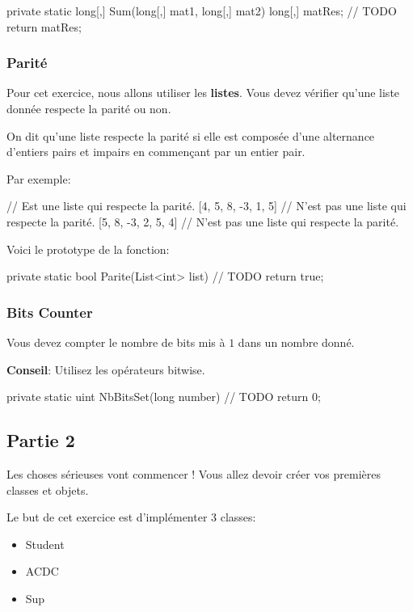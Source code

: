 \begin{code}
private static long[,] Sum(long[,] mat1, long[,] mat2)
{
	long[,] matRes;
	// TODO
    return matRes;
}
\end{code}

\subsubsection{Parité}

Pour cet exercice, nous allons utiliser les \textbf{listes}. Vous devez vérifier qu'une liste donnée respecte la parité ou non.

On dit qu'une liste respecte la parité si elle est composée d'une alternance d'entiers pairs et impairs en commençant par un entier pair.

Par exemple:

\begin{code}
[4, 5, 8, -3, 2, 5] // Est une liste qui respecte la parité.
[4, 5, 8, -3, 1, 5] // N'est pas une liste qui respecte la parité.
[5, 8, -3, 2, 5, 4] // N'est pas une liste qui respecte la parité.
\end{code}

Voici le prototype de la fonction:
\begin{code}
private static bool Parite(List<int> list)
{
	// TODO
    return true;
}
\end{code}

\subsubsection{Bits Counter}

Vous devez compter le nombre de bits mis à \(1\) dans un nombre donné.

\textbf{Conseil}: Utilisez les opérateurs bitwise.

\begin{code}
private static uint NbBitsSet(long number)
{
	// TODO
    return 0;
}
\end{code}

\newpage
\subsection{Partie 2}

Les choses sérieuses vont commencer ! Vous allez devoir créer vos premières classes et objets.

Le but de cet exercice est d'implémenter 3 classes:
\begin{itemize}
\item Student 
\item ACDC 
\item Sup \\
\end{itemize}


